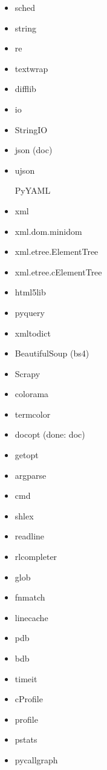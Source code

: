 \documentclass{article}
\begin{document}
\begin{enumerate}
\begin{itemize}
            \item sched

            \item string
            \item re
            \item textwrap
            \item difflib

            \item io
            \item StringIO

            \item json (doc)
            \item ujson

            \itme PyYAML

            \item xml
            \item xml.dom.minidom
            \item xml.etree.ElementTree
            \item xml.etree.cElementTree
            \item html5lib
            \item pyquery
            \item xmltodict
            \item BeautifulSoup (bs4)
            \item Scrapy

            \item colorama
            \item termcolor
            \item docopt (done: doc)
            \item getopt
            \item argparse
            \item cmd
            \item shlex
            \item readline
            \item rlcompleter

            \item glob
            \item fnmatch
            \item linecache

            \item pdb
            \item bdb
            \item timeit
            \item cProfile
            \item profile
            \item pstats
            \item pycallgraph


\end{itemize}
\end{enumerate}
\end{document}
